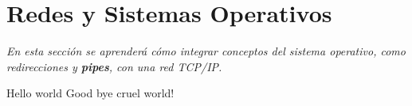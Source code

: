 \section{Redes y Sistemas Operativos}

\textit{En esta sección se aprenderá cómo integrar conceptos del sistema
  operativo, como redirecciones y \textbf{pipes}, con una red TCP/IP.}

\begin{questions}
\question Hello world
\question Good bye cruel world!
\end{questions}
